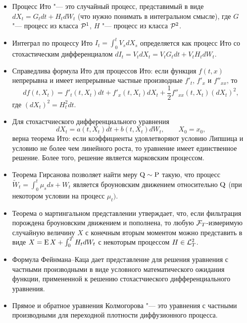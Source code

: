 \begin{itemize}
\item Процесс Ито "--- это случайный процесс, представимый в виде $dX_t = G_t dt + H_t d W_t$ (что нужно понимать в интегральном смысле), где $G$ "--- процесс из класса $\mathcal{P}^1$, $H$ "--- процесс из класса $\mathcal{P}^2$.

\item Интеграл по процессу Ито $I_t = \int_0^t V_s d X_s$ определяется как процесс Ито со стохастическим дифференциалом $d I_t = V_td X_t = V_t G_t dt + V_t H_t dW_t$.

\item Справедлива формула Ито для процессов Ито: если функция $f(t,x)$ непрерывна и имеет непрерывные частные производные $f'_t$, $f'_x$ и $f''_{xx}$, то 
\[
d f(t,X_t) = f'_t(t,X_t) dt + f'_x(t,X_t) dX_t + \frac12 f''_{xx}(t,X_t) (dX_t)^2,
\] 
где $(dX_t)^2 = H_t^2 dt$.

\item Для стохастчиеского дифференциального уравнения
\[
dX_t = a(t,X_t) dt + b(t,X_t) dW_t, \qquad X_0 = x_0,
\]
верна теорема Ито: если коэффициенты удовлетворяют условию Липшица и условию не более чем линейного роста, то уравнение имеет единственное решение. Более того, решение является марковским процессом.

\item Теорема Гирсанова позволяет найти меру $\mathrm{Q}\sim\mathrm{P}$ такую, что процесс $\tilde W_t = \int_0^t\mu_s ds + W_t$ является броуновским движением относительно $\mathrm{Q}$ (при некотором условии на процесс $\mu_t)$.

\item Теорема о мартингальном представлении утверждает, что, если фильтрация порождена броуновским движением и пополнена, то любую $\mathcal{F}_T$-измеримую случайную величину $X$ с конечным вторым моментом можно представить в виде $X = \operatorname{E} X + \int_0^T H_t d W_t$ с некоторым процессом $H\in \mathcal{L}^2_T$.

\item Формула Фейнмана--Каца дает представление для решения уравнения с частными производными в виде условного математического ожидания функции, примененной к решению стохастчиеского дифференциального уравнения.

\item Прямое и обратное уравнения Колмогорова "--- это уравнения с частными производными для переходной плотности диффузионного процесса.
\end{itemize}
